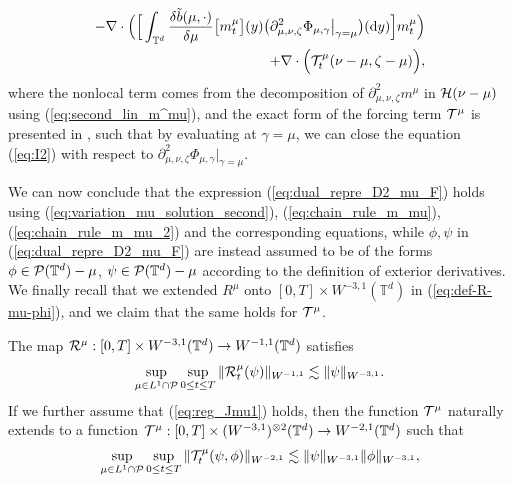 \begin{enumerate}
\begin{equation}
\begin{split}
 -  \nabla \cdot \Big(\Big[ \int_{\mathbb{T}^d} \frac{\delta \tilde{b}(\mu, \cdot)}{\delta\mu}\big[m_t^{\mu}\big](y)\big(\partial^2_{\mu,\nu,\zeta} \Phi_{\mu,\gamma}\big|_{\gamma = \mu}\big)(\mathrm{d}y)\Big]  m_t^{\mu} \Big)\\
  + \nabla \cdot \Big(\mathcal{T}^{\mu}_t(\nu - \mu, \zeta - \mu)\Big),
\end{split}
\end{equation}
where the nonlocal term comes from the decomposition of $\partial^2_{\mu,\nu,\zeta} m^{\mu}$ in $ \mathcal{H}(\nu - \mu)$ using (\ref{eq:second_lin_m^mu}), and the exact form of the forcing term $\mathcal{T}^{\mu}$ is presented in \cite[(A.36)]{djurdjevac2025weak}, such that by evaluating at $\gamma = \mu$, we can close the equation (\ref{eq:I2}) with respect to $\partial^2_{\mu,\nu,\zeta} \Phi_{\mu,\gamma}\big|_{\gamma = \mu}$. 
\end{enumerate}

We can now conclude that the expression (\ref{eq:dual_repre_D2_mu_F}) holds using (\ref{eq:variation_mu_solution_second}), (\ref{eq:chain_rule_m_mu}),  (\ref{eq:chain_rule_m_mu_2}) and the corresponding equations, while $\phi, \psi$ in (\ref{eq:dual_repre_D2_mu_F}) are instead assumed to be of the forms
$\phi \in \mathcal{P}(\mathbb{T}^d) - \mu$, $\psi \in \mathcal{P}(\mathbb{T}^d) - \mu$ according to the definition of exterior derivatives. We finally recall that we extended $R^{\mu}$ onto $[0,T] \times W^{-3,1}(\mathbb{T}^d)$ in (\ref{eq:def-R-mu-phi}), and we claim that the same holds for $\mathcal{T}^{\mu}$.

\begin{lem}\label{eq:reg-forcing-TR}
The map $\mathcal{R}^{\mu}: [0,T] \times W^{-3,1}(\mathbb{T}^d)  \to W^{-1,1}(\mathbb{T}^d)$ satisfies 
\[
\sup_{\mu \in L^1 \cap \mathcal{P}}\sup_{0 \leq t \leq T}\|\mathcal{R}_t^{\mu}(\psi)\|_{W^{-1,1}} \lesssim \|\psi\|_{W^{-3,1}}.
\]
If we further assume that (\ref{eq:reg_Jmu1}) holds, then the function $\mathcal{T}^{\mu}$ naturally extends to a function $\mathcal{T}^{\mu}: [0,T] \times (W^{-3,1})^{\otimes 2}(\mathbb{T}^d)  \to W^{-2,1}(\mathbb{T}^d)$ such that 
\[
\sup_{\mu \in L^1 \cap \mathcal{P}}\sup_{0 \leq t \leq T}\|\mathcal{T}_t^{\mu}(\psi,\phi)\|_{W^{-2,1}} \lesssim \|\psi\|_{W^{-3,1}}\|\phi\|_{W^{-3,1}},
\]
\end{lem}

